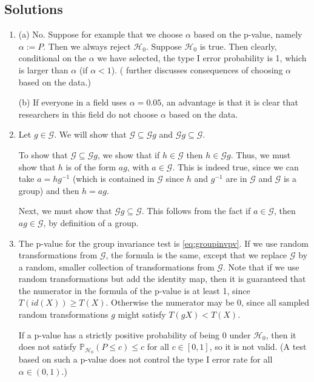\documentclass[11pt]{article}
\theoremstyle{plain}
\theoremstyle{definition}
\newcommand{\G}{\mathcal{G}}
\newcommand{\Hy}{\mathcal{H}}
\newcommand{\pr}{\mathbb{P}}
\begin{document}
\begin{sols}
\subsection{Solutions}
\begin{enumerate}

\item 

(a) No.  Suppose for example that we choose $\alpha$ based on the p-value, namely $\alpha:=P$. Then we always reject $\Hy_0$. Suppose $\Hy_0$ is true. Then clearly, conditional on the $\alpha$ we have selected, the type I error probability is 1, which is larger than $\alpha$ (if $\alpha<1$). (\citealp{hemerik2026choosing} further discusses consequences of choosing $\alpha$ based on the data.)

(b) If everyone in a field uses $\alpha=0.05$, an advantage is that it is clear that researchers in this field do not choose $\alpha$ based on the data.

\item Let $g\in\G$. We will show that $\G\subseteq \G g$ and $\G g \subseteq \G$.   

To show that $\G\subseteq \G g$, we show that if $h\in \G$ then $h\in \G g$.
Thus, we must show that $h$ is of the form $ag$, with $a\in \G$. This is indeed true, since we can take $a=hg^{-1}$ (which is contained in $\G$ since $h$ and $g^{-1}$ are in $\G$ and $\G$ is a group) and then $h=ag$.

Next, we must show that $\G g \subseteq \G$. This follows from the fact if $a\in \G$, then $ag\in \G$, by definition of a group.

\item
The p-value for the group invariance test is \eqref{eq:groupinvpv}. 
If we use random transformations from $\G$, the formula is the same, except that we replace $\G$ by a random, smaller collection of transformations from $\G$.
Note that if we use random transformations but add the identity map, then it is guaranteed that the numerator in the formula of the p-value is at least 1, since $T(id(X))\geq T(X)$. Otherwise the numerator may be 0, since all sampled random transformations $g$ might satisfy $T(gX)< T(X)$.

If a p-value has a strictly positive probability of being 0 under $\Hy_0$, then it does not satisfy $\pr_{\Hy_0}(P\leq c)\leq c$ for all $c\in[0,1]$, so it is not valid.
(A test based on such a p-value does not control the type I error rate for all $\alpha\in(0,1)$.)


\end{enumerate}
\end{sols}
\end{document}
